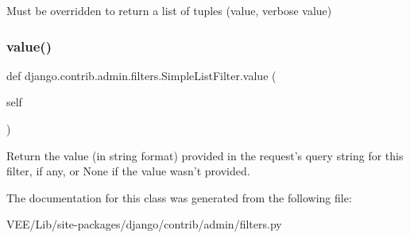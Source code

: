 \begin{DoxyVerb}Must be overridden to return a list of tuples (value, verbose value)
\end{DoxyVerb}
 \mbox{\label{classdjango_1_1contrib_1_1admin_1_1filters_1_1_simple_list_filter_a097bd85958bebea50fff072924c45886}} 
\subsubsection{\texorpdfstring{value()}{value()}}
{\footnotesize\ttfamily def django.\+contrib.\+admin.\+filters.\+Simple\+List\+Filter.\+value (\begin{DoxyParamCaption}\item[{}]{self }\end{DoxyParamCaption})}

\begin{DoxyVerb}Return the value (in string format) provided in the request's
query string for this filter, if any, or None if the value wasn't
provided.
\end{DoxyVerb}
 

The documentation for this class was generated from the following file\+:\begin{DoxyCompactItemize}
\item 
V\+E\+E/\+Lib/site-\/packages/django/contrib/admin/filters.\+py\end{DoxyCompactItemize}
